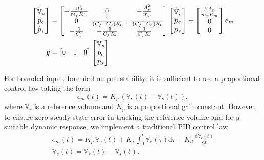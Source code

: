 \footnotesize
\begin{align}\label{eq:LTI}
\nonumber  \begin{bmatrix}
  \ddot{\mathbb{V}}_s \\
  \dot{p}_c \\
  \dot{p}_s
  \end{bmatrix} &=
  \setlength{\arraycolsep}{2pt}
  \begin{bmatrix}
  -\frac{\beta \lambda}{m_p R_m} & 0 & -\frac{A_p^2}{m_p} \\
  0 & \frac{1}{\left( C_f + C_c \right) R_t} & -\frac{1}{\left( C_f + C_c \right) R_t} \\
  -\frac{1}{C_f} & -\frac{1}{C_f R_t} & \frac{1}{C_f R_t}
  \end{bmatrix}
  \begin{bmatrix}
  \dot{\mathbb{V}}_s \\
  p_c \\
  p_s
  \end{bmatrix} +
  \begin{bmatrix}
  \frac{\beta A_p}{m_p R_m} \\
  0 \\
  0
  \end{bmatrix} e_{m}\\
  y &=
  \begin{bmatrix} 0 & 1 & 0
  \end{bmatrix}
  \begin{bmatrix}
  \dot{\mathbb{V}}_s \\
  p_c \\
  p_s
  \end{bmatrix}
\end{align}
\normalsize

For bounded-input, bounded-output stability, it is sufficient to use a proportional control law taking the form
\begin{equation}
    e_m(t) = K_p \, \left( \mathbb{V}_r(t) - \mathbb{V}_s(t) \right),
\end{equation}
where $\mathbb{V}_r$ is a reference volume and $K_p$ is a proportional gain constant. However, to ensure zero steady-state error in tracking the reference volume and for a suitable dynamic response, we implement a traditional PID control law
\begin{eqnarray}
    e_m(t) = K_p \,\mathbb{V}_{e}(t) + K_i \, \int_0^t \mathbb{V}_{e}(\tau) \text{d}\tau + K_d \, \frac{\text{d} \mathbb{V}_{e}(t)}{\text{d} t}\\
    \mathbb{V}_{e}(t) = \mathbb{V}_r(t) - \mathbb{V}_s(t).
\end{eqnarray}


